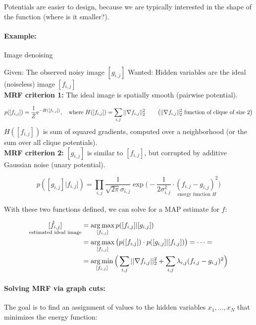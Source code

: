 Potentials are easier to design, because we are typically interested in the shape of the function (where is it smaller?).

\paragraph{Example:} Image denoising 

Given: The observed noisy image $[g_{i,j}]$ \quad Wanted: Hidden variables are the ideal (noiseless) image $[f_{i,j}]$\\

\textbf{MRF criterion 1:} The ideal image is spatially smooth (pairwise potential).

\begin{equation*}
	p([f_{i,j}]) = \frac{1}{Z} \mathrm{e}^{-H([f_{i,j}])}, \quad \text{where } H([f_{i,j}]) = \sum_{i,j} ||\nabla f_{i,j}||_2^2 \qquad \left(||\nabla f_{i,j}||_2^2 \text{ function of clique of size 2}\right)
\end{equation*}
$ H([f_{i,j}]) $ is sum of squared gradients, computed over a neighborhood (or the sum over all clique potentials).\\

\textbf{MRF criterion 2:} $[g_{i,j}]$ is similar to $[f_{i,j}]$, but corrupted by additive Gaussian noise (unary potential).

\begin{equation*}
	p([g_{i,j}] | f_{i,j}]) = \prod_{i,j} \frac{1}{\sqrt{2 \pi} \sigma_{i,j}} \exp\Big(- \frac{1}{2 \sigma_{i,j}^2} \cdot \underset{\text{energy function $H$}}{(f_{i,j} - g_{i,j})^2}\Big)
\end{equation*}

With these two functions defined, we can solve for a MAP estimate for $f$:

\begin{align*}
	\underset{\text{estimated ideal image}}{[\hat{f}_{i,j}]} &= \operatorname*{arg\,max}_{[f_{i,j}]} p([f_{i,j}] | [g_{i,j}])\\
					&= \operatorname*{arg\,max}_{[f_{i,j}]} \big(p([f_{i,j}])\cdot p([g_{i,j}] | [f_{i,j}])\big)=\dots=\\
					&= \operatorname*{arg\,min}_{[f_{i,j}]} \Big(\sum_{i,j} ||\nabla f_{i,j}||_2^2 + \sum_{i,j} \lambda_{i,j} (f_{i,j} - g_{i,j})^2\Big)
\end{align*}

\paragraph{Solving MRF via graph cuts:} 
The goal is to find an assignment of values to the hidden variables $x_1, \dots,x_N$ that minimizes the energy function:

